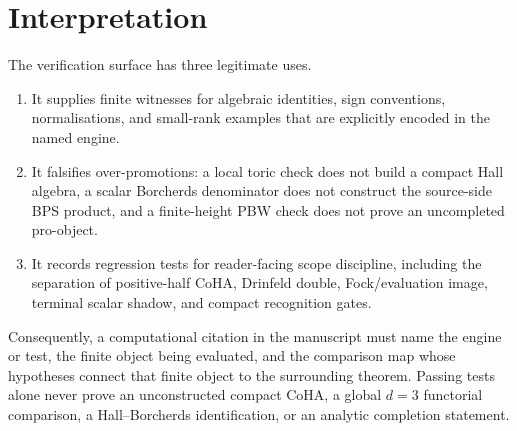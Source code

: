 \section{Interpretation}
\label{sec:verification-interpretation}

The verification surface has three legitimate uses.
\begin{enumerate}[nosep]
\item It supplies finite witnesses for algebraic identities, sign
conventions, normalisations, and small-rank examples that are explicitly
encoded in the named engine.
\item It falsifies over-promotions: a local toric check does not build a
compact Hall algebra, a scalar Borcherds denominator does not construct
the source-side BPS product, and a finite-height PBW check does not
prove an uncompleted pro-object.
\item It records regression tests for reader-facing scope discipline,
including the separation of positive-half CoHA, Drinfeld double,
Fock/evaluation image, terminal scalar shadow, and compact recognition
gates.
\end{enumerate}

Consequently, a computational citation in the manuscript must name the
engine or test, the finite object being evaluated, and the comparison
map whose hypotheses connect that finite object to the surrounding
theorem.  Passing tests alone never prove an unconstructed compact
CoHA, a global \(d=3\) functorial comparison, a Hall--Borcherds
identification, or an analytic completion statement.
